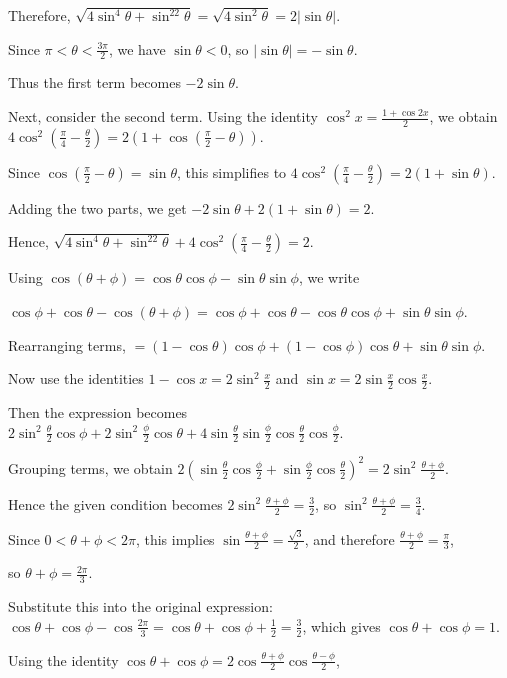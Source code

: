   Therefore, $\sqrt{4\sin^4\theta+\sin^22\theta} =\sqrt{4\sin^2\theta} =2|\sin\theta|$.

  Since $\pi<\theta<\frac{3\pi}{2}$, we have $\sin\theta<0$, so $|\sin\theta|=-\sin\theta$.

  Thus the first term becomes $-2\sin\theta$.

  Next, consider the second term. Using the identity $\cos^2x=\frac{1+\cos2x}{2}$, we obtain
  $4\cos^2\!\left(\frac\pi4-\frac\theta2\right)=2\left(1+\cos\!\left(\frac\pi2-\theta\right)\right)$.

  Since $\cos(\frac\pi2-\theta)=\sin\theta$, this simplifies to
  $4\cos^2\!\left(\frac\pi4-\frac\theta2\right)=2(1+\sin\theta)$.

  Adding the two parts, we get $-2\sin\theta+2(1+\sin\theta)=2$.

  Hence, $\sqrt{4\sin^4\theta+\sin^22\theta} + 4\cos^2\!\left(\frac\pi4-\frac\theta2\right)=2$.
\item Using $\cos(\theta+\phi)=\cos\theta\cos\phi-\sin\theta\sin\phi$, we write

  $\cos\phi+\cos\theta-\cos(\theta+\phi)
  =\cos\phi+\cos\theta-\cos\theta\cos\phi+\sin\theta\sin\phi$.

  Rearranging terms,
  $= (1-\cos\theta)\cos\phi+(1-\cos\phi)\cos\theta+\sin\theta\sin\phi$.

  Now use the identities $1-\cos x=2\sin^2\frac x2$ and $\sin x=2\sin\frac x2\cos\frac x2$.

  Then the expression becomes $2\sin^2\frac\theta2\cos\phi + 2\sin^2\frac\phi2\cos\theta
  +4\sin\frac\theta2\sin\frac\phi2\cos\frac\theta2\cos\frac\phi2$.

  Grouping terms, we obtain $2\left(\sin\frac\theta2\cos\frac\phi2 +\sin\frac\phi2\cos\frac\theta2\right)^2
  =2\sin^2\frac{\theta+\phi}{2}$.

  Hence the given condition becomes $2\sin^2\frac{\theta+\phi}{2}=\frac32$,
  so $\sin^2\frac{\theta+\phi}{2}=\frac34$.

  Since $0<\theta+\phi<2\pi$, this implies $\sin\frac{\theta+\phi}{2}=\frac{\sqrt3}{2}$,
  and therefore $\frac{\theta+\phi}{2}=\frac\pi3$,

  so $\theta+\phi=\frac{2\pi}{3}$.

  Substitute this into the original expression: $\cos\theta+\cos\phi-\cos\frac{2\pi}{3}
  =\cos\theta+\cos\phi+\frac12=\frac32$, which gives $\cos\theta+\cos\phi=1$.

  Using the identity
  $\cos\theta+\cos\phi =2\cos\frac{\theta+\phi}{2}\cos\frac{\theta-\phi}{2}$,

